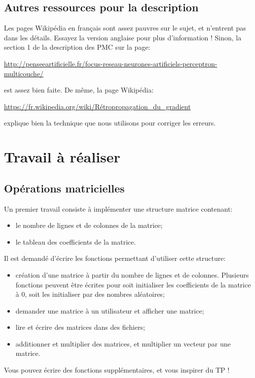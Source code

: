 \documentclass[a4paper]{article}
\begin{document}
\subsection{Autres ressources pour la description}

Les pages Wikipédia en français sont assez pauvres sur le sujet, et
n'entrent pas dans les détails. Essayez la version anglaise pour plus
d'information ! Sinon, la section 1 de la description des PMC sur la
page:
\begin{center}
  \url{http://penseeartificielle.fr/focus-reseau-neurones-artificiels-perceptron-multicouche/}
\end{center}
est assez bien faite.  De même, la page Wikipédia:
\begin{center}
  \url{https://fr.wikipedia.org/wiki/Rétropropagation_du_gradient}
\end{center}
explique bien la technique que nous utilisons pour corriger les
erreurs.


\section{Travail à réaliser}

\subsection{Opérations matricielles}

Un premier travail consiste à implémenter une structure matrice contenant:
\begin{itemize}
\item le nombre de lignes et de colonnes de la matrice;
\item le tableau des coefficients de la matrice.
\end{itemize}
Il est demandé d'écrire les fonctions permettant d'utiliser cette structure:
\begin{itemize}
\item création d'une matrice à partir du nombre de lignes et de
  colonnes. Plusieurs fonctions peuvent être écrites pour soit
  initialiser les coefficients de la matrice à 0, soit les initialiser
  par des nombres aléatoires;
\item demander une matrice à un utilisateur et afficher une matrice;
\item lire et écrire des matrices dans des fichiers;
\item additionner et multiplier des matrices, et multiplier un vecteur
  par une matrice.
\end{itemize}
Vous pouvez écrire des fonctions supplémentaires, et vous inspirer du TP !
\end{document}
